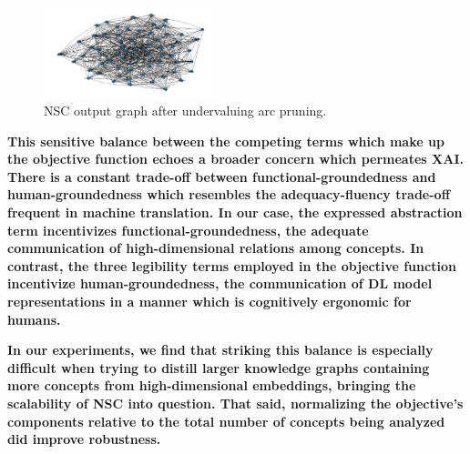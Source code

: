 \begin{figure}[h]
\centering
\includegraphics[width=0.45\textwidth]{img/short_run.png}
\caption{NSC output graph after undervaluing arc pruning.}\label{fig:pruning}
\end{figure}

\textbf{This sensitive balance between the competing terms which make up the objective function echoes a broader concern which permeates XAI. There is a constant trade-off between functional-groundedness and human-groundedness which resembles the adequacy-fluency trade-off frequent in machine translation. In our case, the expressed abstraction term incentivizes functional-groundedness, the adequate communication of high-dimensional relations among concepts. In contrast, the three legibility terms employed in the objective function incentivize human-groundedness, the communication of DL model representations in a manner which is cognitively ergonomic for humans. 
}

\textbf{In our experiments, we find that striking this balance is especially difficult when trying to distill larger knowledge graphs containing more concepts from high-dimensional embeddings, bringing the scalability of NSC into question. That said, normalizing the objective's components relative to the total number of concepts being analyzed did improve robustness.}

